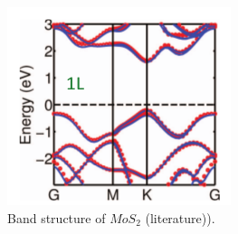 \begin{figure}[ht]
\begin{center}
  \includegraphics[width=0.3\linewidth]{img/MoS2_lit_band_struc}
  \caption{Band structure of $MoS_2$ (literature)).}
\end{center}
\end{figure}  
